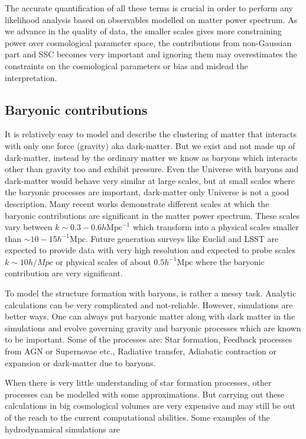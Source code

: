 The accurate quantification of all these terms is crucial in order to perform any
likelihood analysis based on observables modelled on matter power spectrum. As we
advance in the quality of data, the smaller scales gives more constraining power 
over cosmological parameter space, the contributions from non-Gaussian part and SSC
becomes very important and ignoring them may overestimates the constraints on the 
cosmological parameters or bias and mislead the interpretation. 






\subsection{Baryonic contributions}
It is relatively easy to model and describe the clustering of matter that interacts with only 
one force (gravity) aka dark-matter. But we exist and not made up of dark-matter, instead by the
ordinary matter we know as baryons which interacts other than gravity too and exhibit pressure. 
Even the Universe with baryons and dark-matter would behave very similar at large scales,
but at small scales where the baryonic processes are important, dark-matter only Universe is
not a good description. Many recent works demonstrate different scales at which the baryonic
contributions are significant in the matter power spectrum. These scales vary between
$k\sim 0.3-0.6 h \mathrm{Mpc}^{-1}$ which transform into a physical scales smaller than
$\sim 10-15 h^{-1} \mathrm{Mpc}$. Future generation surveys like Euclid and LSST are
expected to provide data with very high resolution and expected to probe scales $k \sim 10 h/Mpc$
or physical scales of about $0.5 h^{-1} \mathrm{Mpc}$ where the baryonic contribution 
are very significant.

To model the structure formation with baryons, is rather a messy task. Analytic calculations
can be very complicated and not-reliable. However, simulations are better ways. One can always
put baryonic matter along with dark matter in the simulations and evolve governing gravity and
baryonic processes which are known to be important. Some of the processes are: 
Star formation,
Feedback processes from AGN or Supernovae etc.,
Radiative transfer,
Adiabatic contraction or expansion or dark-matter due to baryons.

When there is very little understanding of star formation processes, other processes can be 
modelled with some approximations. But carrying out these calculations in big cosmological 
volumes are very expensive and may still be out of the reach to the current computational 
abilities. Some examples of the hydrodynamical simulations are \cite{}

